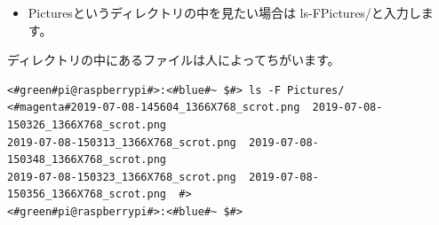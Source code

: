 \documentclass[text03.tex]{subfiles}
\begin{document}
\begin{itemize}
  \item[<例>] Picturesというディレクトリの中を見たい場合は ls\textvisiblespace -F\textvisiblespace Pictures/と入力します。 
\end{itemize}

ディレクトリの中にあるファイルは人によってちがいます。
\begin{lstlisting}[caption=ls -F Pictures/コマンドの例,label=lsFPicttest]
<#green#pi@raspberrypi#>:<#blue#~ $#> ls -F Pictures/
<#magenta#2019-07-08-145604_1366X768_scrot.png  2019-07-08-150326_1366X768_scrot.png  
2019-07-08-150313_1366X768_scrot.png  2019-07-08-150348_1366X768_scrot.png  
2019-07-08-150323_1366X768_scrot.png  2019-07-08-150356_1366X768_scrot.png  #>
<#green#pi@raspberrypi#>:<#blue#~ $#> 
\end{lstlisting}
\end{document}

